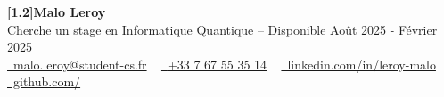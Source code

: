\begin{center}
    {\Huge\bfseries\sffamily \scalebox{1.0}[1.2]{Malo Leroy}}
    \\ Cherche un stage en Informatique Quantique -- Disponible Août 2025 - Février 2025 \\
    \small
    \href{mailto:malo.leroy@student-cs.fr}{\raisebox{-0.2\height}\faEnvelope\  malo.leroy@student-cs.fr} ~
    \href{tel:+33767553514}{\raisebox{-0.2\height}\faPhone\  {+33 7 67 55 35 14}} ~
    \href{https://linkedin.com/in/leroy-malo}{\raisebox{-0.2\height}\faLinkedin\ linkedin.com/in/leroy-malo}  ~
    \href{https://github.com/\ghusername}{\raisebox{-0.2\height}\faGithub\ github.com/\ghusername}
\end{center}

